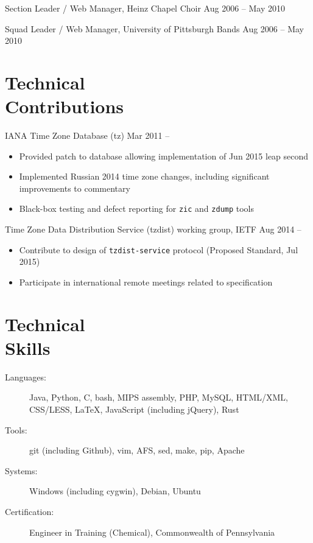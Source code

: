 \documentclass[11pt]{article}
\newcommand{\textdb}[1]{\fontseries{db}\selectfont#1\normalfont}
\newcommand{\present}{\phantom{Xxx 20XX}}
\newcommand{\itemizeonly}{\leavevmode\par\vspace{\dimexpr-\baselineskip-\parskip}}
\begin{document}
\selectfont
Section Leader / Web Manager, Heinz Chapel Choir
	\hfill Aug 2006 -- May 2010
\normalfont

\selectfont
Squad Leader / Web Manager, University of Pittsburgh Bands
	\hfill Aug 2006 -- May 2010
\normalfont



\section{Technical\\ Contributions}

\textdb{
IANA Time Zone Database (tz)
	\hfill Mar 2011 -- \present
}
\begin{itemize}
	\item Provided patch to database allowing implementation of Jun 2015 leap second
	\item Implemented Russian 2014 time zone changes,
		including significant improvements to commentary
	\item Black-box testing and defect reporting for \texttt{zic} and \texttt{zdump} tools
\end{itemize}

\textdb{
Time Zone Data Distribution Service (tzdist) working group, IETF
	\hfill Aug 2014 -- \present
}
\begin{itemize}
	\item Contribute to design of \texttt{tzdist-service} protocol (Proposed Standard, Jul 2015)
	\item Participate in international remote meetings related to specification
\end{itemize}



\section{Technical\\ Skills}

\itemizeonly
\begin{description}
	\item[\textdb{Languages:}] Java, Python, C, bash, MIPS assembly, PHP, MySQL, HTML/XML, CSS/LESS,
		\LaTeX, JavaScript (including jQuery), Rust
	\item[\textdb{Tools:}] git (including Github), vim, AFS, sed, make, pip, Apache
	\item[\textdb{Systems:}] Windows (including cygwin), Debian, Ubuntu
	\item[\textdb{Certification:}] Engineer in Training (Chemical), Commonwealth of Pennsylvania
\end{description}
\end{document}
